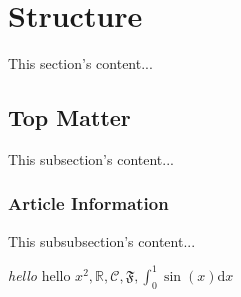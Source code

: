 \documentclass{article}
\begin{document}
\author{Someone}
\maketitle

\section{Structure}
This section's content...

\subsection{Top Matter}
This subsection's content...

\subsubsection{Article Information}
This subsubsection's content...

\emph{hello} hello $x^2, \mathbb R, \mathcal C, \mathfrak F, \int_0^1 \sin(x) \mathrm d x$
\end{document}
